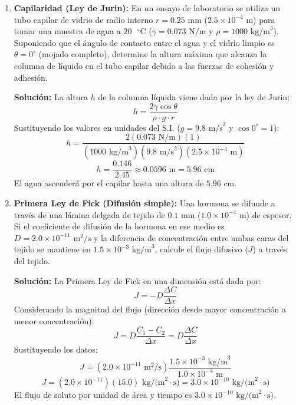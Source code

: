 \documentclass[12pt,letterpaper]{article}
\begin{document}
\begin{enumerate}
    \vspace{0.3cm}
    \item \textbf{Capilaridad (Ley de Jurin):} En un ensayo de laboratorio se utiliza un tubo capilar de vidrio de radio interno $r = 0.25 \text{ mm}$ ($2.5 \times 10^{-4} \text{ m}$) para tomar una muestra de agua a $20 \text{ }^{\circ}\text{C}$ ($\gamma = 0.073 \text{ N/m}$ y $\rho = 1000 \text{ kg/m}^3$). Suponiendo que el ángulo de contacto entre el agua y el vidrio limpio es $\theta = 0^{\circ}$ (mojado completo), determine la altura máxima que alcanza la columna de líquido en el tubo capilar debido a las fuerzas de cohesión y adhesión.
    
    \textbf{Solución:}
    La altura $h$ de la columna líquida viene dada por la ley de Jurin:
    \[
    h = \frac{2\gamma \cos \theta}{\rho \cdot g \cdot r}
    \]
    Sustituyendo los valores en unidades del S.I. ($g = 9.8 \text{ m/s}^2$ y $\cos 0^{\circ} = 1$):
    \[
    h = \frac{2(0.073 \text{ N/m})(1)}{(1000 \text{ kg/m}^3)(9.8 \text{ m/s}^2)(2.5 \times 10^{-4} \text{ m})}
    \]
    \[
    h = \frac{0.146}{2.45} \approx 0.0596 \text{ m} = 5.96 \text{ cm}
    \]
    El agua ascenderá por el capilar hasta una altura de $5.96 \text{ cm}$.

    \vspace{0.3cm}
    \item \textbf{Primera Ley de Fick (Difusión simple):} Una hormona se difunde a través de una lámina delgada de tejido de $0.1 \text{ mm}$ ($1.0 \times 10^{-4} \text{ m}$) de espesor. Si el coeficiente de difusión de la hormona en ese medio es $D = 2.0 \times 10^{-11} \text{ m}^2\text{/s}$ y la diferencia de concentración entre ambas caras del tejido se mantiene en $1.5 \times 10^{-3} \text{ kg/m}^3$, calcule el flujo difusivo ($J$) a través del tejido.
    
    \textbf{Solución:}
    La Primera Ley de Fick en una dimensión está dada por:
    \[
    J = -D \frac{\Delta C}{\Delta x}
    \]
    Considerando la magnitud del flujo (dirección desde mayor concentración a menor concentración):
    \[
    J = D \frac{C_1 - C_2}{\Delta x} = D \frac{\Delta C}{\Delta x}
    \]
    Sustituyendo los datos:
    \[
    J = (2.0 \times 10^{-11} \text{ m}^2\text{/s}) \frac{1.5 \times 10^{-3} \text{ kg/m}^3}{1.0 \times 10^{-4} \text{ m}}
    \]
    \[
    J = (2.0 \times 10^{-11}) (15.0) \text{ kg/(m}^2\cdot\text{s)} = 3.0 \times 10^{-10} \text{ kg/(m}^2\cdot\text{s)}
    \]
    El flujo de soluto por unidad de área y tiempo es $3.0 \times 10^{-10} \text{ kg/(m}^2\cdot\text{s)}$.


\end{enumerate}
\end{document}
